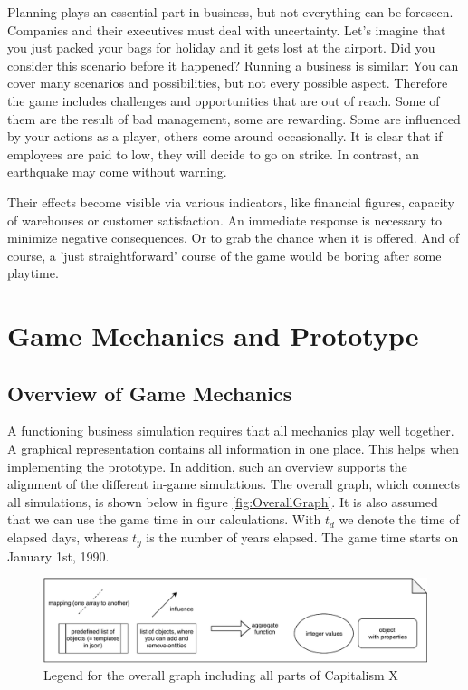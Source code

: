 \documentclass[11pt,titlepage,oneside,openany]{book}
\begin{document}
Planning plays an essential part in business, but not everything can be foreseen. Companies and their executives must deal with uncertainty. Let's imagine that you just packed your bags for holiday and it gets lost at the airport. Did you consider this scenario before it happened? Running a business is similar: You can cover many scenarios and possibilities, but not every possible aspect. Therefore the game includes challenges and opportunities that are out of reach. Some of them are the result of bad management, some are rewarding. Some are influenced by your actions as a player, others come around occasionally. It is clear that if employees are paid to low, they will decide to go on strike. In contrast, an earthquake may come without warning. 

Their effects become visible via various indicators, like financial figures, capacity of warehouses or customer satisfaction. An immediate response is necessary to minimize negative consequences. Or to grab the chance when it is offered. And of course, a 'just straightforward' course of the game would be boring after some playtime. 

\chapter{Game Mechanics and Prototype}
\label{cha:alg}

\section{Overview of Game Mechanics} 
\label{sec:link}

A functioning business simulation requires that all mechanics play well together. A graphical representation contains all information in one place. This helps when implementing the prototype. In addition, such an overview supports the alignment of the different in-game simulations. The overall graph, which connects all simulations, is shown below in figure \ref{fig:OverallGraph}. 
It is also assumed that we can use the game time in our calculations. With $t_d$ we denote the time of elapsed days, whereas $t_y$ is the number of years elapsed. The game time starts on January 1st, 1990. 

\begin{figure}[H]
    \centering
    \includegraphics[width=\textwidth]{fullGraph_legend.pdf}
    \caption{Legend for the overall graph including all parts of Capitalism X}
    \label{fig:OverallGraphLegend}
\end{figure}
\end{document}
